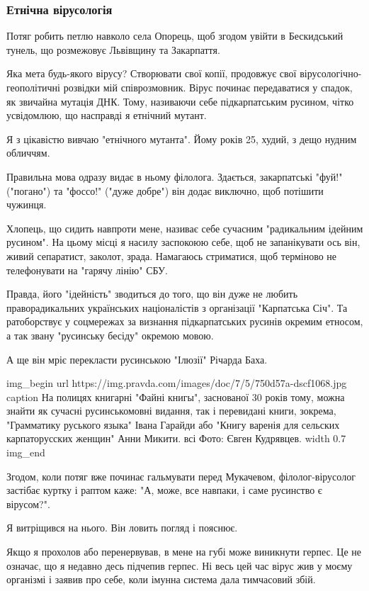 \subsubsection{Етнічна вірусологія}

Потяг робить петлю навколо села Опорець, щоб згодом увійти в Бескидський
тунель, що розмежовує Львівщину та Закарпаття.

\textemdash Яка мета будь-якого вірусу? Створювати свої копії, \textemdash продовжує свої
вірусологічно-геополітичні розвідки мій співрозмовник. \textemdash Вірус починає
передаватися у спадок, як звичайна мутація ДНК. Тому, називаючи себе
підкарпатським русином, чітко усвідомлюю, що насправді я етнічний мутант.

Я з цікавістю вивчаю "етнічного мутанта". Йому років 25, худий, з дещо нудним
обличчям.

Правильна мова одразу видає в ньому філолога. Здається, закарпатські "фуй!"
("погано") та "фоссо!" ("дуже добре") він додає виключно, щоб потішити чужинця.

Хлопець, що сидить навпроти мене, називає себе сучасним "радикальним ідейним
русином". На цьому місці я насилу заспокоюю себе, щоб не запанікувати \textemdash ось
він, живий сепаратист, заколот, зрада. Намагаюсь стриматися, щоб терміново не
телефонувати на "гарячу лінію" СБУ. 

Правда, його "ідейність" зводиться до того, що він дуже не любить
праворадикальних українських націоналістів з організації "Карпатська Січ". Та
ратоборствує у соцмережах за визнання підкарпатських русинів окремим етносом, а
так звану "русинську бесіду" \textemdash окремою мовою.

А ще він мріє перекласти русинською "Ілюзії" Річарда Баха.

\ifcmt
img_begin 
    url https://img.pravda.com/images/doc/7/5/750d57a-dscf1068.jpg
    caption На полицях книгарні "Файні книгы", заснованої 30 років тому, можна знайти як сучасні русинськомовні видання, так і перевидані книги, зокрема, "Грамматику руського языка" Івана Гарайди або "Книгу варенія для сельских карпаторусских женщин" Анни Микити. всі Фото: Євген Кудрявцев.
    width 0.7
img_end
\fi

Згодом, коли потяг вже починає гальмувати перед Мукачевом, філолог-вірусолог
застібає куртку і раптом каже: "А, може, все навпаки, і саме русинство є
вірусом?".

Я витріщився на нього. Він ловить погляд і пояснює.

\textemdash Якщо я прохолов або перенервував, в мене на губі може виникнути герпес. Це не
означає, що я недавно десь підчепив герпес. Ні \textemdash весь цей час вірус жив у моєму
організмі і заявив про себе, коли імунна система дала тимчасовий збій.

